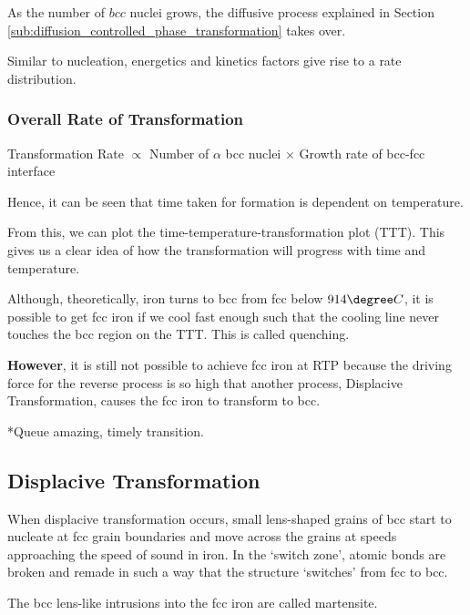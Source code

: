 
As the number of $bcc$ nuclei grows, the diffusive process explained in Section \ref{sub:diffusion_controlled_phase_transformation} takes over.

Similar to nucleation, energetics and kinetics factors give rise to a rate distribution.

\subsubsection{Overall Rate of Transformation}


Transformation Rate $\propto$ Number of $\alpha$ bcc nuclei $\times$ Growth rate of bcc-fcc interface


Hence, it can be seen that time taken for formation is dependent on temperature.

From this, we can plot the time-temperature-transformation plot (TTT). This gives us a clear idea of how the transformation will progress with time and temperature.


Although, theoretically, iron turns to bcc from fcc below $914\degree C$, it is possible to get fcc iron if we cool fast enough such that the cooling line never touches the bcc region on the TTT. This is called quenching.


\textbf{However}, it is still not possible to achieve fcc iron at RTP because the driving force for the reverse process is so high that another process, Displacive Transformation, causes the fcc iron to transform to bcc.

*Queue amazing, timely transition.



\subsection{Displacive Transformation} %
\label{sub:displace}

When displacive transformation occurs, small lens-shaped grains of bcc start to nucleate at fcc grain boundaries and move across the grains at speeds approaching the speed of sound in iron. In the ‘switch zone’, atomic bonds are broken and remade in such a way that the structure ‘switches’ from fcc to bcc.

The bcc lens-like intrusions into the fcc iron are called martensite.

